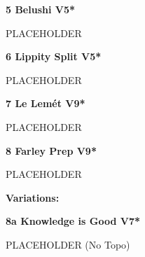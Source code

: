 	\begin{multicols}{2}


\needspace{1.5cm}
\label{rt:Belushi}
\colorbox{RoyalBlue!20}{
\parbox{0.95\linewidth}{
\textbf{
5 Belushi V5*  
}}}

\begin{adjustwidth}{0.5cm}{}			
PLACEHOLDER
\end{adjustwidth}



\needspace{1.5cm}
\label{rt:Lippity Split}
\colorbox{RoyalBlue!20}{
\parbox{0.95\linewidth}{
\textbf{
6 Lippity Split V5*  
}}}

\begin{adjustwidth}{0.5cm}{}			
PLACEHOLDER
\end{adjustwidth}



\needspace{1.5cm}
\label{rt:Le Lemét}
\colorbox{Goldenrod!50}{
\parbox{0.95\linewidth}{
\textbf{
7 Le Lemét V9*  
}}}

\begin{adjustwidth}{0.5cm}{}			
PLACEHOLDER
\end{adjustwidth}



\needspace{1.5cm}
\label{rt:Farley Prep}
\colorbox{Goldenrod!50}{
\parbox{0.95\linewidth}{
\textbf{
8 Farley Prep V9*  
}}}

\begin{adjustwidth}{0.5cm}{}			
PLACEHOLDER
\end{adjustwidth}

\begin{adjustwidth}{0.5cm}{}				
\needspace{3cm}
\textbf{Variations:} \newline

\needspace{1.5cm}
\label{vr:Knowledge is Good}
\colorbox{Goldenrod!50}{
\parbox{0.95\linewidth}{
\textbf{
8a Knowledge is Good V7*  
}}}

\begin{adjustwidth}{0.5cm}{}			
PLACEHOLDER (No Topo)
\end{adjustwidth}


\end{adjustwidth}




\end{multicols}
\clearpage